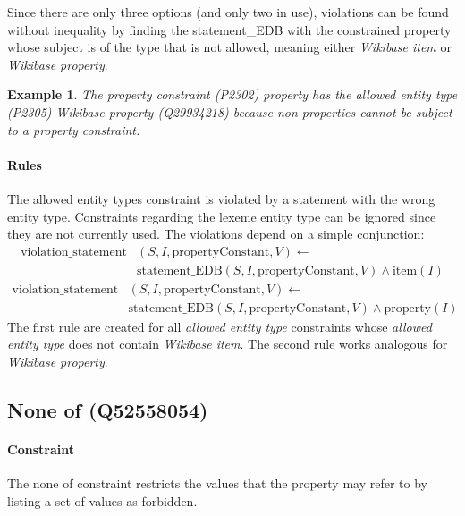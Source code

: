 \documentclass[hyperref,bachelorofscience,fleqn]{cgvpub}
\newtheorem{example}{Example}
\begin{document}
Since there are only three options (and only two in use), violations can be found without inequality by finding the statement\_EDB with the constrained property whose subject is of the type that is not allowed, meaning either \emph{Wikibase item} or \emph{Wikibase property}.

\begin{example}
The \emph{property constraint} (P2302) property has the \emph{allowed entity type} (P2305) \emph{Wikibase property} (Q29934218) because non-properties cannot be subject to a property constraint.
\end{example}

\paragraph{Rules}
The allowed entity types constraint is violated by a statement with the wrong entity type.  Constraints regarding the lexeme entity type can be ignored since they are not currently used. The violations depend on a simple conjunction:
\begin{equation*}
\begin{split}
\text{violation\_statement}&(S, I, \text{propertyConstant}, V) \leftarrow \\
&\text{statement\_EDB}(S, I, \text{propertyConstant}, V) \wedge \text{item}(I)
\end{split}
\end{equation*}
\begin{equation*}
\begin{split}
\text{violation\_statement}&(S, I, \text{propertyConstant}, V) \leftarrow \\
&\text{statement\_EDB}(S, I, \text{propertyConstant}, V) \wedge \text{property}(I)
\end{split}
\end{equation*}
The first rule are created for all \emph{allowed entity type} constraints whose \emph{allowed entity type} does not contain \emph{Wikibase item}. The second rule works analogous for \emph{Wikibase property}.

\subsection{None of (Q52558054)}
\paragraph{Constraint}
The none of constraint restricts the values that the property may refer to by listing a set of values as forbidden.
\end{document}
